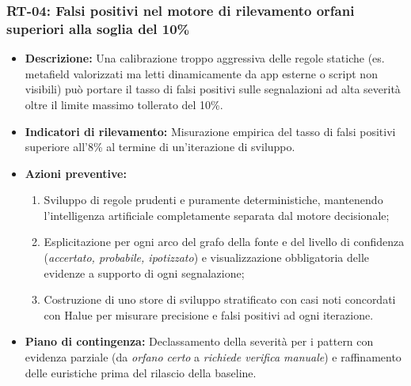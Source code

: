 \subsubsection{RT-04: Falsi positivi nel motore di rilevamento orfani superiori alla soglia del 10\%}
\begin{itemize}
    \item \textbf{Descrizione:} Una calibrazione troppo aggressiva delle regole statiche (es. metafield valorizzati ma letti dinamicamente da app esterne o script non visibili) può portare il tasso di falsi positivi sulle segnalazioni ad alta severità oltre il limite massimo tollerato del 10\%.
    \item \textbf{Indicatori di rilevamento:} Misurazione empirica del tasso di falsi positivi superiore all'8\% al termine di un'iterazione di sviluppo.
    \item \textbf{Azioni preventive:}
    \begin{enumerate}
        \item Sviluppo di regole prudenti e puramente deterministiche, mantenendo l'intelligenza artificiale completamente separata dal motore decisionale;
        \item Esplicitazione per ogni arco del grafo della fonte e del livello di confidenza (\textit{accertato, probabile, ipotizzato}) e visualizzazione obbligatoria delle evidenze a supporto di ogni segnalazione;
        \item Costruzione di uno store di sviluppo stratificato con casi noti concordati con Halue per misurare precisione e falsi positivi ad ogni iterazione.
    \end{enumerate}
    \item \textbf{Piano di contingenza:} Declassamento della severità per i pattern con evidenza parziale (da \textit{orfano certo} a \textit{richiede verifica manuale}) e raffinamento delle euristiche prima del rilascio della baseline.
\end{itemize}

